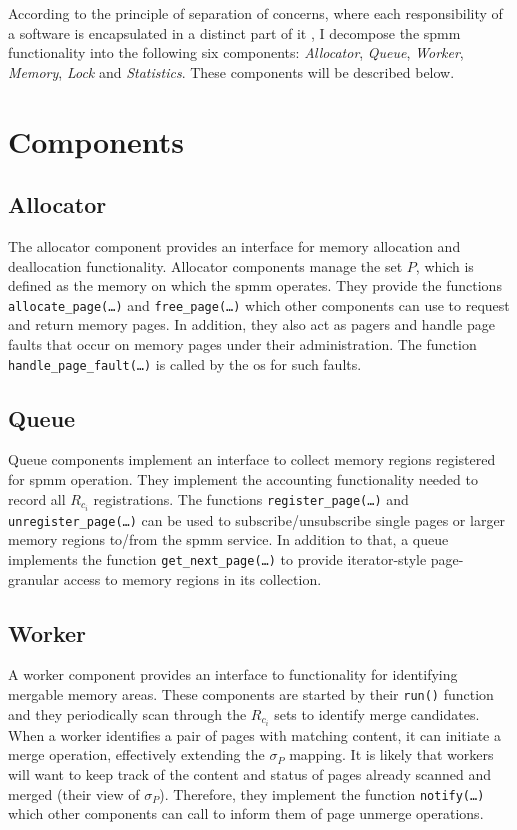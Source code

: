 According to the principle of separation of concerns, where each responsibility of a software is encapsulated in a distinct part of it \cite{soc1982}, I decompose the \ac{spmm} functionality into the following six components: \emph{Allocator},  \emph{Queue}, \emph{Worker}, \emph{Memory}, \emph{Lock} and \emph{Statistics}.
These components will be described below.

\section{Components}
\label{sec:components}

\subsection*{Allocator}
\label{subsec:allocator}

The allocator component provides an interface for memory allocation and deallocation functionality.
Allocator components manage the set $P$, which is defined as the memory on which the \ac{spmm} operates.
They provide the functions \texttt{allocate\_page(\ldots)} and \texttt{free\_page(\ldots)} which other components can use to request and return memory pages.
In addition, they also act as pagers and handle page faults that occur on memory pages under their administration.
The function \texttt{handle\_page\_fault(\ldots)} is called by the \ac{os} for such faults.

\subsection*{Queue}
\label{subsec:queue}

Queue components implement an interface to collect memory regions registered for \ac{spmm} operation.
They implement the accounting functionality needed to record all $R_{c_i}$ registrations.
The functions \texttt{register\_page(\ldots)} and \texttt{unregister\_page(\ldots)} can be used to subscribe/unsubscribe single pages or larger memory regions to/from the \ac{spmm} service.
In addition to that, a queue implements the function \texttt{get\_next\_page(\ldots)} to provide iterator-style page-granular access to memory regions in its collection.

\subsection*{Worker}
\label{subsec:Worker}

A worker component provides an interface to functionality for identifying mergable memory areas.
These components are started by their \texttt{run()} function and they periodically scan through the $R_{c_i}$ sets to identify merge candidates.
When a worker identifies a pair of pages with matching content, it can initiate a merge operation, effectively extending the $\sigma_P$ mapping.
It is likely that workers will want to keep track of the content and status of pages already scanned and merged (their view of $\sigma_P$).
Therefore, they implement the function \texttt{notify(\ldots)} which other components can call to inform them of page unmerge operations.

